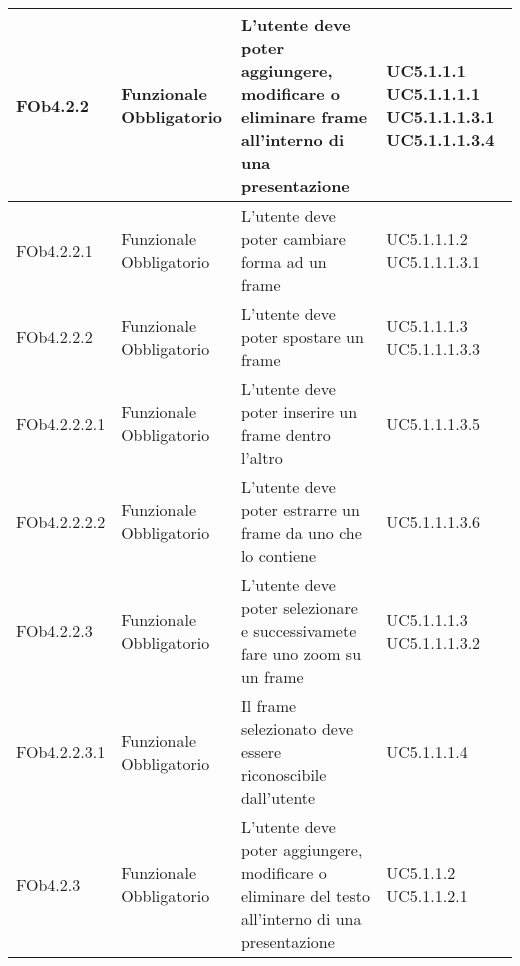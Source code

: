 \begin{longtable}{|l|p{2.5cm}|p{2cm}|l|}
\hline
FOb4.2.2 & Funzionale \linebreak Obbligatorio & L'utente deve poter aggiungere, modificare o eliminare frame  all'interno di una presentazione & UC5.1.1.1 \linebreak  UC5.1.1.1.1 \linebreak  UC5.1.1.1.3.1 \linebreak  UC5.1.1.1.3.4 \linebreak  \\
\hline
FOb4.2.2.1 & Funzionale \linebreak Obbligatorio & L'utente deve poter cambiare forma ad un frame  & UC5.1.1.1.2 \linebreak  UC5.1.1.1.3.1 \linebreak  \\
\hline
FOb4.2.2.2 & Funzionale \linebreak Obbligatorio & L'utente deve poter spostare un frame  & UC5.1.1.1.3 \linebreak  UC5.1.1.1.3.3 \linebreak  \\
\hline
FOb4.2.2.2.1 & Funzionale \linebreak Obbligatorio & L'utente deve poter inserire un frame  dentro l'altro  & UC5.1.1.1.3.5 \linebreak  \\
\hline
FOb4.2.2.2.2 & Funzionale \linebreak Obbligatorio & L'utente deve poter estrarre un frame  da uno che lo contiene & UC5.1.1.1.3.6 \linebreak  \\
\hline
FOb4.2.2.3 & Funzionale \linebreak Obbligatorio & L'utente deve poter selezionare e successivamete fare uno zoom su un frame  & UC5.1.1.1.3 \linebreak  UC5.1.1.1.3.2 \linebreak  \\
\hline
FOb4.2.2.3.1 & Funzionale \linebreak Obbligatorio & Il frame selezionato deve essere riconoscibile dall'utente & UC5.1.1.1.4 \linebreak  \\
\hline
FOb4.2.3 & Funzionale \linebreak Obbligatorio & L'utente deve poter aggiungere, modificare o eliminare del testo all'interno di una presentazione  & UC5.1.1.2 \linebreak  UC5.1.1.2.1 \linebreak  \\

\end{longtable}
